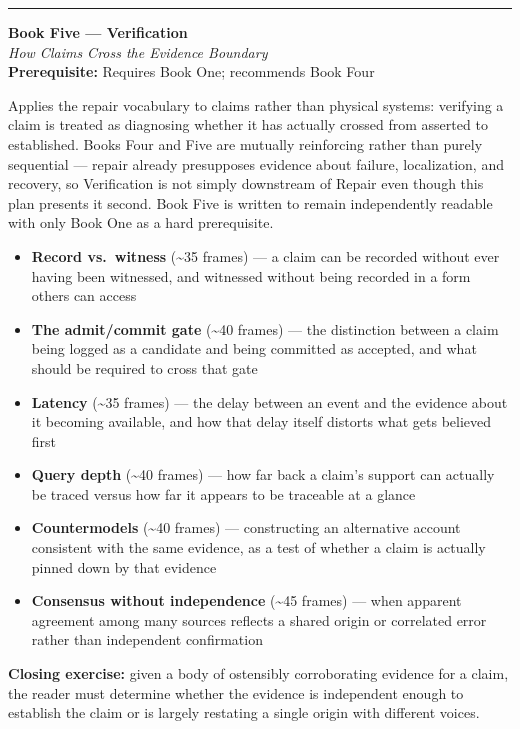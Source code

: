 \documentclass[11pt]{article}
\newenvironment{bookentry}[3]{%
  \par\noindent\rule{\linewidth}{0.5pt}\par\vspace{0.5em}
  {\Large\bfseries #1}\\[0.15em]
  {\itshape\large #2}\\[0.3em]
  {\small\textbf{Prerequisite:} #3}\par\vspace{0.6em}
}{\par\vspace{0.8em}}
\newenvironment{sectionlist}{%
  \begin{itemize}[leftmargin=1.4em, itemsep=0.45em, topsep=0.3em]
}{%
  \end{itemize}
}
\newcommand{\secitem}[3]{\item \textbf{#1} (\textasciitilde#2 frames) --- #3}
\begin{document}
\begin{bookentry}{Book Five --- Verification}{How Claims Cross the Evidence Boundary}{Requires Book One; recommends Book Four}
Applies the repair vocabulary to claims rather than physical systems: verifying a claim is treated as diagnosing whether it has actually crossed from asserted to established. Books Four and Five are mutually reinforcing rather than purely sequential --- repair already presupposes evidence about failure, localization, and recovery, so Verification is not simply downstream of Repair even though this plan presents it second. Book Five is written to remain independently readable with only Book One as a hard prerequisite.

\begin{sectionlist}
\secitem{Record vs.\ witness}{35}{a claim can be recorded without ever having been witnessed, and witnessed without being recorded in a form others can access}
\secitem{The admit/commit gate}{40}{the distinction between a claim being logged as a candidate and being committed as accepted, and what should be required to cross that gate}
\secitem{Latency}{35}{the delay between an event and the evidence about it becoming available, and how that delay itself distorts what gets believed first}
\secitem{Query depth}{40}{how far back a claim's support can actually be traced versus how far it appears to be traceable at a glance}
\secitem{Countermodels}{40}{constructing an alternative account consistent with the same evidence, as a test of whether a claim is actually pinned down by that evidence}
\secitem{Consensus without independence}{45}{when apparent agreement among many sources reflects a shared origin or correlated error rather than independent confirmation}
\end{sectionlist}
\textbf{Closing exercise:} given a body of ostensibly corroborating evidence for a claim, the reader must determine whether the evidence is independent enough to establish the claim or is largely restating a single origin with different voices.
\end{bookentry}
\end{document}

